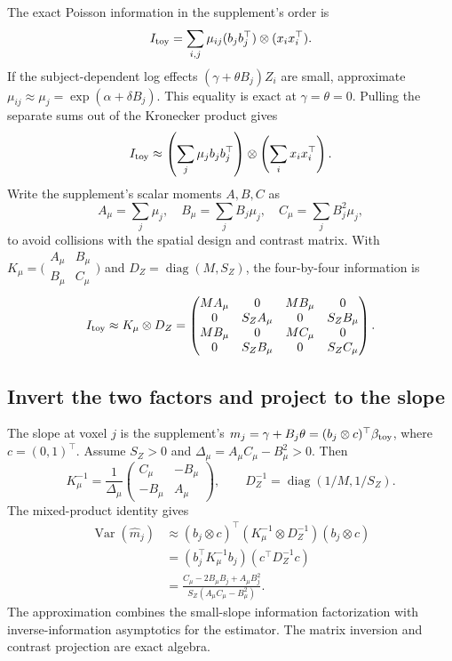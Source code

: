 \documentclass[11pt,a4paper]{article}
\newcommand{\Var}{\operatorname{Var}}
\newcommand{\diag}{\operatorname{diag}}
\numberwithin{equation}{section}
\begin{document}
The exact Poisson information in the supplement's order is
\[
 I_{\rm toy}=\sum_{i,j}\mu_{ij}
                     (b_jb_j^\top)\otimes(x_ix_i^\top).
\]
If the subject-dependent log effects $(\gamma+\theta B_j)Z_i$
are small, approximate
$\mu_{ij}\approx\mu_j=\exp(\alpha+\delta B_j)$.
This equality is exact at $\gamma=\theta=0$.
Pulling the separate sums out of the Kronecker product gives
\[
 I_{\rm toy}\approx
 \left(\sum_j\mu_j b_jb_j^\top\right)\otimes
 \left(\sum_i x_ix_i^\top\right).
\]
Write the supplement's scalar moments $A,B,C$ as
\[
 A_\mu=\sum_j\mu_j,\quad
 B_\mu=\sum_jB_j\mu_j,\quad
 C_\mu=\sum_jB_j^2\mu_j,
\]
to avoid collisions with the spatial design and contrast matrix.
With $K_\mu=\bigl(\begin{smallmatrix}A_\mu&B_\mu\\
B_\mu&C_\mu\end{smallmatrix}\bigr)$ and
$D_Z=\diag(M,S_Z)$, the four-by-four information is
\begin{equation}
 I_{\rm toy}\approx K_\mu\otimes D_Z
 =\begin{pmatrix}
 MA_\mu&0&MB_\mu&0\\
 0&S_ZA_\mu&0&S_ZB_\mu\\
 MB_\mu&0&MC_\mu&0\\
 0&S_ZB_\mu&0&S_ZC_\mu
 \end{pmatrix}.
 \label{lesion-toy-information}
\end{equation}

\subsection{Invert the two factors and project to the slope}
The slope at voxel $j$ is the supplement's
$m_j=\gamma+B_j\theta=(b_j\otimes c)^\top\beta_{\rm toy}$,
where $c=(0,1)^\top$.
Assume $S_Z>0$ and
$\Delta_\mu=A_\mu C_\mu-B_\mu^2>0$.
Then
\[
 K_\mu^{-1}=\frac1{\Delta_\mu}
       \begin{pmatrix}C_\mu&-B_\mu\\-B_\mu&A_\mu\end{pmatrix},
 \qquad D_Z^{-1}=\diag(1/M,1/S_Z).
\]
The mixed-product identity gives
\begin{align}
 \Var(\widehat m_j)
 &\approx(b_j\otimes c)^\top
             (K_\mu^{-1}\otimes D_Z^{-1})(b_j\otimes c)\\
 &=(b_j^\top K_\mu^{-1}b_j)(c^\top D_Z^{-1}c)\\
 &=\frac{C_\mu-2B_\mu B_j+A_\mu B_j^2}
                {S_Z(A_\mu C_\mu-B_\mu^2)}.
 \label{lesion-toy-variance-formula}
\end{align}
The approximation combines the small-slope information
factorization with inverse-information asymptotics for the estimator.
The matrix inversion and contrast projection are exact algebra.
\end{document}
